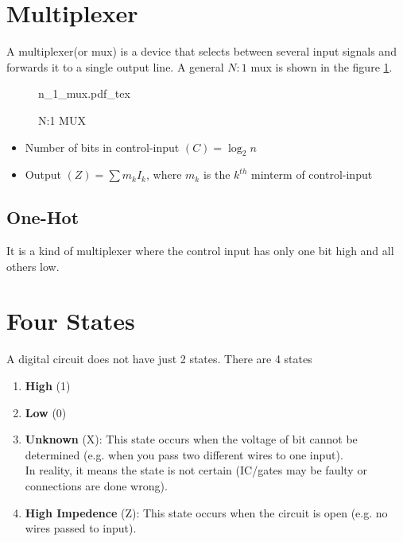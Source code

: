 \documentclass[oneside]{book}
\newcommand{\incfig}[1]{%
    {#1.pdf_tex}
}
\begin{document}
\section{Multiplexer}
A multiplexer(or mux) is a device that selects between several input signals and forwards it to a single output line. \cite{multiplexer_wiki}
A general \(N:1\) mux is shown in the figure \cref{n_1_mux}.
\begin{figure}[H]
	\centering
	\incfig{n_1_mux}
	\caption{N:1 MUX}
	\label{n_1_mux}
\end{figure}
\begin{itemize}
	\item Number of bits in control-input \((C) = \log_2{n}\)
	\item Output \((Z) = \sum{m_kI_k}\), where \(m_k\) is the \(k^{th}\) minterm of control-input
\end{itemize}

\subsection{One-Hot}
It is a kind of multiplexer where the control input has only one bit high and all others low. \cite{one_hot_wiki}

\section{Four States}
A digital circuit does not have just 2 states. There are 4 states
\begin{enumerate}
	\item \textbf{High} (1)
	\item \textbf{Low} (0)
	\item \textbf{Unknown} (X): This state occurs when the voltage of bit cannot be determined (e.g. when you pass two different wires to one input).\\
	      In reality, it means the state is not certain (IC/gates may be faulty or connections are done wrong).
	\item \textbf{High Impedence} (Z): This state occurs when the circuit is open (e.g. no wires passed to input).
\end{enumerate}
\end{document}
